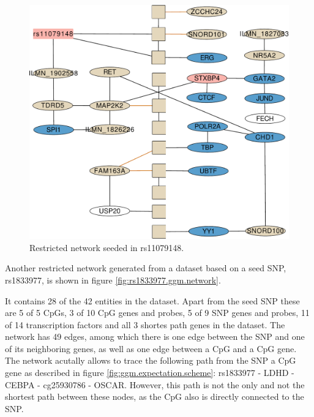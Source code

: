 \documentclass[a4paper,12pt,twoside,openright]{article}
\begin{document}
\begin{figure}[tb]
	\includegraphics[scale = 0.2, keepaspectratio = true]{"../figures/rs11079148"}  
	\caption{Restricted network seeded in rs11079148. }
    \label{fig:rs11079148.ggm.network}
\end{figure}

Another restricted network generated from a dataset based on a seed SNP, rs1833977, is shown in figure \ref{fig:rs1833977.ggm.network}. 

It contains 28 of the 42 entities in the dataset. Apart from the seed SNP these are 5 of 5 CpGs, 3 of 10 CpG genes and probes, 5 of 9 SNP genes and probes, 11 of 14 transcription factors and all 3 shortes path genes in the dataset. The network has 49 edges, among which there is one edge between the SNP and one of its neighboring genes, as well as one edge between a CpG and a CpG gene. The network acutally allows to trace the following path from the SNP a CpG gene as described in figure \ref{fig:ggm.expectation.scheme}: rs1833977 - LDHD - CEBPA - cg25930786 - OSCAR. However, this path is not the only and not the shortest path between these nodes, as the CpG also is directly connected to the SNP. 
\end{document}
